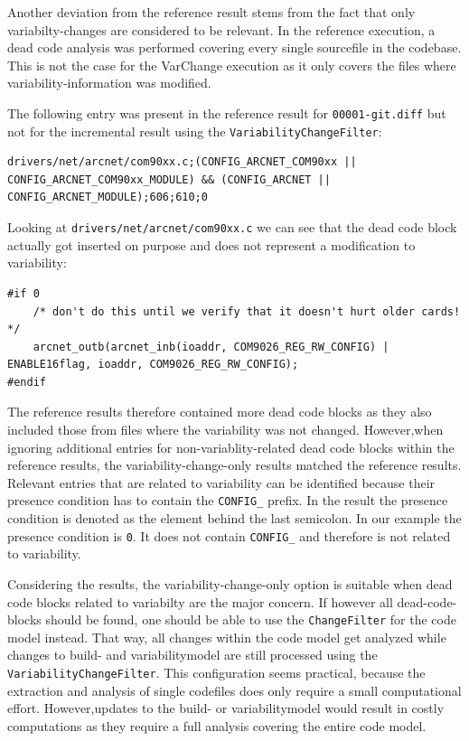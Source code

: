 \documentclass[a4paper]{article}
\begin{document}
Another deviation from the reference result stems from the fact that only variabilty-changes are considered to be relevant. In the reference execution, a dead code analysis was performed covering every single sourcefile in the codebase. This is not the case for the VarChange execution as it only covers the files where variability-information was modified.

The following entry was present in the reference result for \texttt{00001-git.diff} but not for the incremental result using the \texttt{VariabilityChangeFilter}:

\begin{lstlisting}
drivers/net/arcnet/com90xx.c;(CONFIG_ARCNET_COM90xx || CONFIG_ARCNET_COM90xx_MODULE) && (CONFIG_ARCNET || CONFIG_ARCNET_MODULE);606;610;0
\end{lstlisting}

Looking at \texttt{drivers/net/arcnet/com90xx.c} we can see that the dead code block actually got inserted on purpose and does not represent a modification to variability:

\begin{lstlisting}
#if 0
    /* don't do this until we verify that it doesn't hurt older cards! */
    arcnet_outb(arcnet_inb(ioaddr, COM9026_REG_RW_CONFIG) | ENABLE16flag, ioaddr, COM9026_REG_RW_CONFIG);
#endif
\end{lstlisting}

The reference results therefore contained more dead code blocks as they also included those from files where the variability was not changed. However,when ignoring additional entries for non-variablity-related dead code blocks within the reference results, the variability-change-only results matched the reference results. Relevant entries that are related to variability can be identified because their presence condition has to contain the \texttt{CONFIG\_} prefix. In the result the presence condition is denoted as the element behind the last semicolon. In our example the presence condition is \texttt{0}. It does not contain \texttt{CONFIG\_} and therefore is not related to variability.

Considering the results, the variability-change-only option is suitable when dead code blocks related to variabilty are the major concern. If however all dead-code-blocks should be found, one should be able to use the \texttt{ChangeFilter} for the code model instead. That way, all changes within the code model get analyzed while changes to build- and variabilitymodel are still processed using the \texttt{VariabilityChangeFilter}. This configuration seems practical, because the extraction and analysis of single codefiles does only require a small computational effort. However,updates to the build- or variabilitymodel would result in costly computations as they require a full analysis covering the entire code model.
\end{document}

